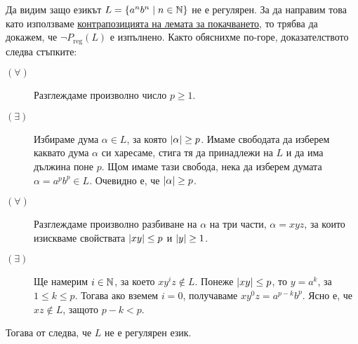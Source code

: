 \begin{example}\label{ex:regular:pumping:an-bn}
  Да видим защо езикът $L = \{a^nb^n \mid n\in \mathbb{N}\}$ не е регулярен.
  За да направим това като използваме \hyperref[cor:regular:pumping]{контрапозицията на лемата за покачването}, то трябва да докажем, че
  $\neg P_{\text{reg}}(L)$ е изпълнено.
  Както обяснихме по-горе, доказателството следва стъпките:
  \begin{description}
  \item[$(\forall)$]
    Разглеждаме произволно число $p \geq 1$.
  \item[$(\exists)$]
    Избираме дума $\alpha \in L$, за която $\lvert{\alpha}\rvert \geq p$. Имаме свободата да изберем каквато дума $\alpha$
    си харесаме, стига тя да принадлежи на $L$ и да има дължина поне $p$.
    Щом имаме тази свобода, нека да изберем думата $\alpha = a^pb^p \in L$.
    Очевидно е, че $\lvert{\alpha}\rvert \geq p$.
  \item[$(\forall)$]
    Разглеждаме произволно разбиване на $\alpha$ на три части, $\alpha = xyz$,
    за които изискваме свойствата $\lvert{xy}\rvert \leq p$ и $\lvert{y}\rvert \geq 1$.
  \item[$(\exists)$]
    Ще намерим $i\in\mathbb{N}$, за което $xy^iz \not\in L$.
    Понеже $\lvert{xy}\rvert \leq p$, то $y = a^k$, за  $1\leq k \leq p$.
    Тогава ако вземем $i = 0$, получаваме $xy^0z = a^{p-k}b^p$.
    Ясно е, че $xz \not\in L$, защото $p-k < p$.
  \end{description}  
  Тогава от  следва, че $L$ не е регулярен език.
\end{example}


